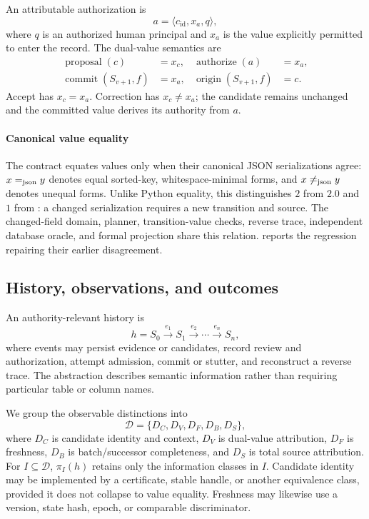 An attributable authorization is
\begin{equation}
a=\langle c_{\mathrm{id}},x_a,q\rangle,
\label{eq:authorization}
\end{equation}
where $q$ is an authorized human principal and $x_a$ is the value explicitly permitted to enter the record. The dual-value semantics are
\begin{align}
\operatorname{proposal}(c)&=x_c, &
\operatorname{authorize}(a)&=x_a,\nonumber\\
\operatorname{commit}(S_{v+1},f)&=x_a, &
\operatorname{origin}(S_{v+1},f)&=c.
\label{eq:dual-value}
\end{align}
Accept has $x_c=x_a$. Correction has $x_c\neq x_a$; the candidate remains unchanged and the committed value derives its authority from $a$.

\paragraph{Canonical value equality}
The contract equates values only when their canonical JSON serializations agree: $x\mathrel{=_{\mathrm{json}}} y$ denotes equal sorted-key, whitespace-minimal forms, and $x\mathrel{\neq_{\mathrm{json}}} y$ denotes unequal forms. Unlike Python equality, this distinguishes $2$ from $2.0$ and $1$ from : a changed serialization requires a new transition and source. The changed-field domain, planner, transition-value checks, reverse trace, independent database oracle, and formal projection share this relation.  reports the regression repairing their earlier disagreement.

\subsection{History, observations, and outcomes}

An authority-relevant history is
\begin{equation}
h=S_0\xrightarrow{e_1}S_1\xrightarrow{e_2}\cdots\xrightarrow{e_n}S_n,
\end{equation}
where events may persist evidence or candidates, record review and authorization, attempt admission, commit or stutter, and reconstruct a reverse trace. The abstraction describes semantic information rather than requiring particular table or column names.

We group the observable distinctions into
\begin{equation}
\mathcal D=\{D_C,D_V,D_F,D_B,D_S\},
\label{eq:distinction-basis}
\end{equation}
where $D_C$ is candidate identity and context, $D_V$ is dual-value attribution, $D_F$ is freshness, $D_B$ is batch/successor completeness, and $D_S$ is total source attribution. For $I\subseteq\mathcal D$, $\pi_I(h)$ retains only the information classes in $I$. Candidate identity may be implemented by a certificate, stable handle, or another equivalence class, provided it does not collapse to value equality. Freshness may likewise use a version, state hash, epoch, or comparable discriminator.

